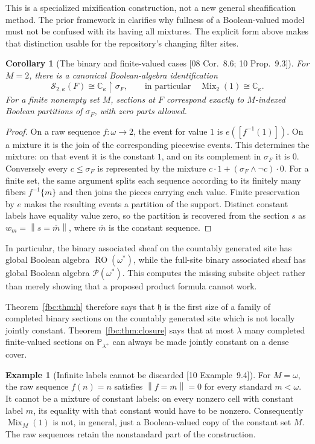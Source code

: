 \documentclass[11pt,letterpaper]{article}
\newtheorem{corollary}[theorem]{Corollary}
\theoremstyle{definition}
\newtheorem{example}[theorem]{Example}
\theoremstyle{remark}
\newcommand{\om}{\omega}
\newcommand{\C}{\mathbb C}
\newcommand{\PP}{\mathbb P}
\newcommand{\pow}{\mathcal P}
\newcommand{\ch}{\mathfrak h}
\newcommand{\RO}{\operatorname{RO}}
\newcommand{\Mix}{\operatorname{Mix}}
\newcommand{\Ssh}{\mathscr S}
\newcommand{\truth}[1]{\left\lVert #1\right\rVert}
\newcommand{\res}{\mathbin{\upharpoonright}}
\newcommand{\src}[1]{\textup{[#1]}}
\begin{document}
This is a specialized mixification construction, not a new general
sheafification method. The prior framework in \cite{PV} clarifies
why fullness of a Boolean-valued model must not be confused with
its having all mixtures. The explicit form above makes that
distinction usable for the repository's changing filter sites.

\begin{corollary}[The binary and finite-valued cases \src{08 Cor.~8.6; 10 Prop.~9.3}]
\label{fbc:cor:binary}
For $M=2$, there is a canonical Boolean-algebra identification
\[
 \Ssh_{2,\kappa}(F)\cong\C_\kappa\res\sigma_F,
 \qquad\text{in particular}\quad\Mix_2(1)\cong\C_\kappa.
\]
For a finite nonempty set $M$, sections at $F$ correspond exactly
to $M$-indexed Boolean partitions of $\sigma_F$, with zero parts
allowed.
\end{corollary}
\begin{proof}
On a raw sequence $f:\om\to2$, the event for value $1$ is
$e([f^{-1}(1)])$. On a mixture it is the join of the corresponding
piecewise events. This determines the mixture: on that event it
is the constant $1$, and on its complement in $\sigma_F$ it is
$0$. Conversely every $c\leq\sigma_F$ is represented by the
mixture $c\cdot1+(\sigma_F\wedge\neg c)\cdot0$.
For a finite set, the same argument splits each sequence according
to its finitely many fibers $f^{-1}\{m\}$ and then joins the pieces
carrying each value. Finite preservation by $e$ makes the resulting
events a partition of the support. Distinct constant labels have
equality value zero, so the partition is recovered from the section $s$
as $w_m=\truth{s=\overline m}$, where $\overline m$ is the constant
sequence.
\end{proof}

In particular, the binary associated sheaf on the countably generated
site has global Boolean algebra $\RO(\om^*)$, while the full-site
binary associated sheaf has global Boolean algebra $\pow(\om^*)$.
This computes the missing subsite object rather than merely showing
that a proposed product formula cannot work.

Theorem~\ref{fbc:thm:h} therefore says that $\ch$ is the first size of a
family of completed binary sections on the countably generated site
which is not locally jointly constant. Theorem~\ref{fbc:thm:closure} says
that at most $\lambda$ many completed finite-valued sections on
$\PP_{\lambda^+}$ can always be made jointly constant on a dense cover.

\begin{example}[Infinite labels cannot be discarded \src{10 Example~9.4}]
\label{fbc:ex:infinite-labels}
For $M=\om$, the raw sequence $f(n)=n$ satisfies
$\truth{f=\overline m}=0$ for every standard $m<\om$. It cannot be a
mixture of constant labels: on every nonzero cell with constant label
$m$, its equality with that constant would have to be nonzero.
Consequently $\Mix_M(1)$ is not, in general, just a Boolean-valued
copy of the constant set $M$. The raw sequences retain the nonstandard
part of the construction.
\end{example}
\end{document}
